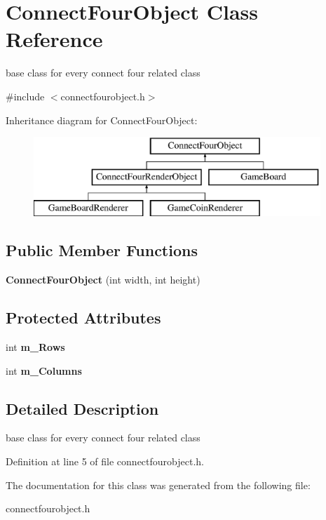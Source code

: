 \hypertarget{class_connect_four_object}{\section{Connect\-Four\-Object Class Reference}
\label{class_connect_four_object}
}


base class for every connect four related class  




{\ttfamily \#include $<$connectfourobject.\-h$>$}

Inheritance diagram for Connect\-Four\-Object\-:\begin{figure}[H]
\begin{center}
\leavevmode
\includegraphics[height=3.000000cm]{class_connect_four_object}
\end{center}
\end{figure}
\subsection*{Public Member Functions}
\begin{DoxyCompactItemize}
\item 
\hypertarget{class_connect_four_object_a6dabab64cdbd0b264aebf42435dd901b}{{\bfseries Connect\-Four\-Object} (int width, int height)}\label{class_connect_four_object_a6dabab64cdbd0b264aebf42435dd901b}

\end{DoxyCompactItemize}
\subsection*{Protected Attributes}
\begin{DoxyCompactItemize}
\item 
\hypertarget{class_connect_four_object_ae6e240f90182a3ff58790a1307ccd1b1}{int {\bfseries m\-\_\-\-Rows}}\label{class_connect_four_object_ae6e240f90182a3ff58790a1307ccd1b1}

\item 
\hypertarget{class_connect_four_object_a6a2622a917669b269f88af84f25425eb}{int {\bfseries m\-\_\-\-Columns}}\label{class_connect_four_object_a6a2622a917669b269f88af84f25425eb}

\end{DoxyCompactItemize}


\subsection{Detailed Description}
base class for every connect four related class 

Definition at line 5 of file connectfourobject.\-h.



The documentation for this class was generated from the following file\-:\begin{DoxyCompactItemize}
\item 
connectfourobject.\-h\end{DoxyCompactItemize}
